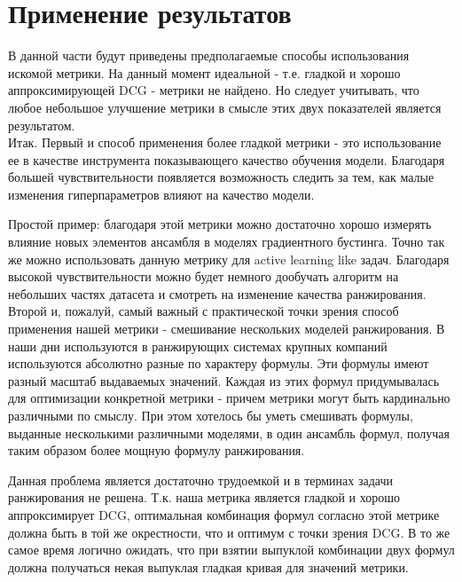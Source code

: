 \documentclass[12pt,a4paper]{amsart}
\theoremstyle{definition}
\theoremstyle{definition}
\begin{document}

\newpage
\section{Применение результатов}

В данной части будут приведены предполагаемые способы использования искомой метрики. На данный момент идеальной - т.е. гладкой и хорошо аппроксимирующей DCG - метрики не найдено. Но следует учитывать, что любое небольшое улучшение метрики в смысле этих двух показателей является результатом. \\

Итак. Первый и способ применения более гладкой метрики - это использование ее в качестве инструмента показывающего качество обучения модели. Благодаря большей чувствительности появляется возможность следить за тем, как малые изменения гиперпараметров влияют на качество модели.

Простой пример: благодаря этой метрики можно достаточно хорошо измерять влияние новых элементов ансамбля в моделях градиентного бустинга. Точно так же можно использовать данную метрику для active learning like задач. Благодаря высокой чувствительности можно будет немного дообучать алгоритм на небольших частях датасета и смотреть на изменение качества ранжирования. \\

Второй и, пожалуй, самый важный с практической точки зрения способ применения нашей метрики - смешивание нескольких моделей ранжирования. В наши дни используются в ранжирующих системах крупных компаний используются абсолютно разные по характеру формулы. Эти формулы имеют разный масштаб выдаваемых значений. Каждая из этих формул придумывалась для оптимизации конкретной метрики - причем метрики могут быть кардинально различными по смыслу. При этом хотелось бы уметь смешивать формулы, выданные несколькими различными моделями, в один ансамбль формул, получая таким образом более мощную формулу ранжирования.

Данная проблема является достаточно трудоемкой и в терминах задачи ранжирования не решена. Т.к. наша метрика является гладкой и хорошо аппроксимирует DCG, оптимальная комбинация формул согласно этой метрике должна быть в той же окрестности, что и оптимум с точки зрения DCG. В то же самое время логично ожидать, что при взятии выпуклой комбинации двух формул должна получаться некая выпуклая гладкая кривая для значений метрики. \\
\end{document}
